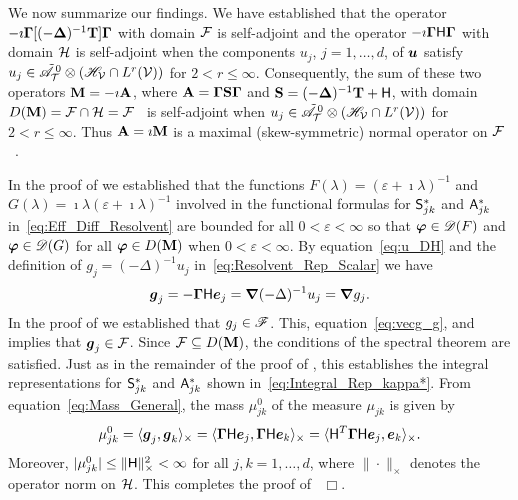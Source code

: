 \documentclass[amsa]{ipart}
\begin{document}
We now summarize our findings. We have established that the operator
$-\imath\mbox{\boldmath${\Gamma}$}[(-\mbox{\boldmath${\Delta}$})^{-1}\mathbf{T}]\mbox{\boldmath${\Gamma}$}$ with domain $\mathcal{F}$ is
self-adjoint and the operator $-\imath\mbox{\boldmath${\Gamma}$}\mathsf{H}\mbox{\boldmath${\Gamma}$}$ with domain $\mathcal{H}$
is self-adjoint when the components $u_j$, $j=1,\ldots,d$, of $\boldsymbol{u}$
satisfy $u_j\in\tilde{\mathscr{A}}^{\,0}_{\mathcal{T}}\otimes(\mathscr{H}_{\mathcal{V}}\cap L^r(\mathcal{V}))$ for
$2<r\leq\infty$. Consequently, the sum  of these two operators
$\mathbf{M}=-\imath\mathbf{A}$, where $\mathbf{A}=\mbox{\boldmath${\Gamma}$}\mathbf{S}\mbox{\boldmath${\Gamma}$}$ and
$\mathbf{S}=(-\mbox{\boldmath${\Delta}$})^{-1}\mathbf{T}+\mathsf{H}$, with domain
$D(\mathbf{M})=\mathcal{F}\cap\mathcal{H}=\mathcal{F}$~\cite{Stone:64} is self-adjoint when
$u_j\in\tilde{\mathscr{A}}^{\,0}_{\mathcal{T}}\otimes(\mathscr{H}_{\mathcal{V}}\cap L^r(\mathcal{V}))$ for $2<r\leq\infty$. Thus
$\mathbf{A}=\imath \mathbf{M}$ is a maximal (skew-symmetric) normal operator on
$\mathcal{F}$~\cite{Stone:64}.            




In the proof of  we established that the
functions $F(\lambda)=(\varepsilon+\imath\lambda)^{-1}$ and $G(\lambda)=\imath\lambda(\varepsilon+\imath\lambda)^{-1}$ involved in the
functional formulas for $\mathsf{S}^*_{jk}$ and $\mathsf{A}^*_{jk}$
in~\eqref{eq:Eff_Diff_Resolvent} are bounded for all $0<\varepsilon<\infty$ so 
that $\boldsymbol{\varphi}\in\mathscr{D}(F)$ and $\boldsymbol{\varphi}\in\mathscr{D}(G)$ for all $\boldsymbol{\varphi}\in
D(\mathbf{M})$ when $0<\varepsilon<\infty$. By equation~\eqref{eq:u_DH}
and the definition of $g_j=(-\Delta)^{-1}u_j$
in~\eqref{eq:Resolvent_Rep_Scalar} we have  
%
\begin{align}\label{eq:vecg_g}
  \vecg_j=-\bGamma\Hm\vece_j=\bnabla(-\Delta)^{-1}u_j=\bnabla g_j.
\end{align}
%
In the proof of  we established that
$g_j\in\mathscr{F}$. This, equation~\eqref{eq:vecg_g}, and
 implies that $\boldsymbol{g}_j\in\mathcal{F}$.  
Since $\mathcal{F}\subseteq D(\mathbf{M})$, the conditions of the spectral theorem are 
satisfied. Just as in the remainder of the proof of
, this establishes the integral
representations for $\mathsf{S}^*_{jk}$ and $\mathsf{A}^*_{jk}$ shown
in~\eqref{eq:Integral_Rep_kappa*}. From 
equation~\eqref{eq:Mass_General}, the mass $\mu_{jk}^0$ of the measure 
$\mu_{jk}$ is given by  
% 
\begin{align}\label{eq:Mass}
  \mu^0_{jk}   =\langle\vecg_j,\vecg_k\rangle_\times
        =\langle\bGamma\Hm\vece_j,\bGamma\Hm\vece_k\rangle_\times 
        =\langle\Hm^T\bGamma\Hm\vece_j,\vece_k\rangle_\times.     
\end{align}
%
Moreover,  $|\mu^0_{jk}|\leq\|\mathsf{H}\|_\times^2<\infty$ for all $j,k=1,\ldots,d$, where $\|\cdot\|_\times$
denotes the operator norm on $\mathcal{H}$. This completes the proof
of~ $\Box$.  
\end{document}
